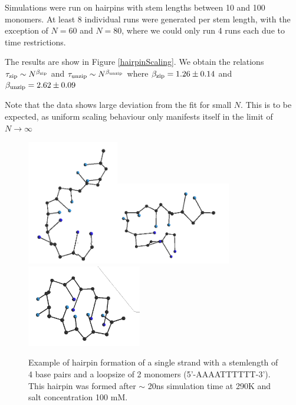 Simulations were run on hairpins with stem lengths between 10 and 100 monomers. At least 8 individual runs were generated per stem length, with the exception of $N = 60$ and $N = 80$, where we could only run 4 runs each due to time restrictions.

The results are show in Figure \ref{hairpinScaling}. We obtain the relations ${\tau_\text{zip}} \sim N^{\beta_\text{zip}}$ and ${\tau_\text{unzip}} \sim N^{\beta_\text{unzip}}$ where ${\beta_\text{zip}} = 1.26 \pm 0.14$ and ${\beta_\text{unzip}} = 2.62 \pm 0.09$

Note that the data shows large deviation from the fit for small $N$. This is to be expected, as uniform scaling behaviour only manifests itself in the limit of $N \to \infty$


\begin{figure}[hbt]
\begin{center}
\includegraphics[width=4cm]{images/results_hairpin1}\includegraphics[width=5cm]{images/results_hairpin2}\includegraphics[width=5cm]{images/results_hairpin3}
\end{center}
\caption{Example of hairpin formation of a single strand with a stemlength of 4 base pairs and a loopsize of 2 monomers (5'-AAAATTTTTT-3'). This hairpin was formed after $\sim$ 20ns simulation time at 290K and salt concentration 100 mM.}
\label{results_hairpin}
\end{figure}




